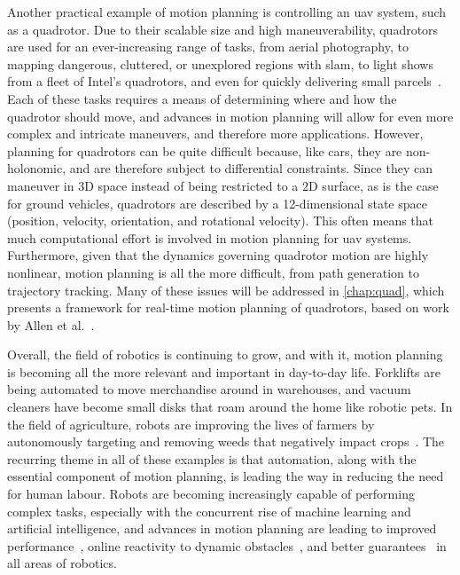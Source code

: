 Another practical example of motion planning is controlling an \gls{uav} system, such as a quadrotor. Due to their scalable size and high maneuverability, quadrotors are used for an ever-increasing range of tasks, from aerial photography, to mapping dangerous, cluttered, or unexplored regions with \gls{slam}, to light shows from a fleet of Intel's quadrotors, and even for quickly delivering small parcels~\cite{Yang2013, Richter2016}. Each of these tasks requires a means of determining where and how the quadrotor should move, and advances in motion planning will allow for even more complex and intricate maneuvers, and therefore more applications. However, planning for quadrotors can be quite difficult because, like cars, they are non-holonomic, and are therefore subject to differential constraints. Since they can maneuver in 3D space instead of being restricted to a 2D surface, as is the case for ground vehicles, quadrotors are described by a 12-dimensional state space (position, velocity, orientation, and rotational velocity). This often means that much computational effort is involved in motion planning for \gls{uav} systems. Furthermore, given that the dynamics governing quadrotor motion are highly nonlinear, motion planning is all the more difficult, from path generation to trajectory tracking. Many of these issues will be addressed in \autoref{chap:quad}, which presents a framework for real-time motion planning of quadrotors, based on work by Allen et al.~\cite{Allen2016}.

Overall, the field of robotics is continuing to grow, and with it, motion planning is becoming all the more relevant and important in day-to-day life. Forklifts are being automated to move merchandise around in warehouses, and vacuum cleaners have become small disks that roam around the home like robotic pets. In the field of agriculture, robots are improving the lives of farmers by autonomously targeting and removing weeds that negatively impact crops~\cite{Wendel2016}. The recurring theme in all of these examples is that automation, along with the essential component of motion planning, is leading the way in reducing the need for human labour. Robots are becoming increasingly capable of performing complex tasks, especially with the concurrent rise of machine learning and artificial intelligence, and advances in motion planning are leading to improved performance~\cite{Greeff2018}, online reactivity to dynamic obstacles~\cite{Allen2016}, and better guarantees~\cite{Lin2014} in all areas of robotics.


